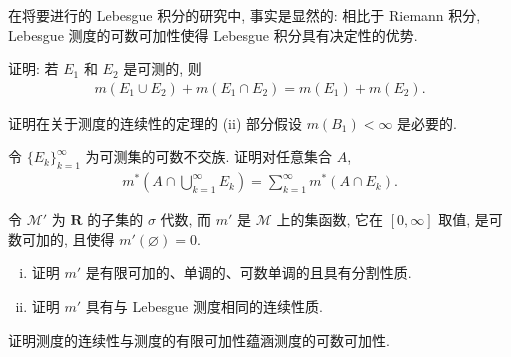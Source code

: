 \documentclass[../../main.tex]{subfiles}
\begin{document}
\begin{remark}
在将要进行的 Lebesgue 积分的研究中, 事实是显然的: 相比于 Riemann 积分, Lebesgue 测度的可数可加性使得 Lebesgue 积分具有决定性的优势.
\end{remark}

\begin{exercise}\label{exercise:ch02-24}
证明: 若 $E_{1}$ 和 $E_{2}$ 是可测的, 则
\begin{align*}
m(E_{1}\cup E_{2})+m(E_{1}\cap E_{2})=m(E_{1})+m(E_{2}).
\end{align*}
\end{exercise}

\begin{exercise}\label{exercise:ch02-25}
证明在关于测度的连续性的定理的 (ii) 部分假设 $m(B_{1})<\infty$ 是必要的.
\end{exercise}

\begin{exercise}\label{exercise:ch02-26}
令 $\{E_{k}\}_{k=1}^{\infty}$ 为可测集的可数不交族. 证明对任意集合 $A$,
\begin{align*}
m^{*}\left(A\cap\bigcup_{k=1}^{\infty}E_{k}\right)=\sum_{k=1}^{\infty}m^{*}(A\cap E_{k}).
\end{align*}
\end{exercise}

\begin{exercise}\label{exercise:ch02-27}
令 $\mathcal{M}'$ 为 $\mathbf{R}$ 的子集的 $\sigma$ 代数, 而 $m'$ 是 $\mathcal{M}$ 上的集函数, 它在 $[0,\infty]$ 取值, 是可数可加的, 且使得 $m'(\varnothing)=0$.
\begin{enumerate}[(i)]
\item 证明 $m'$ 是有限可加的、单调的、可数单调的且具有分割性质.
\item 证明 $m'$ 具有与 Lebesgue 测度相同的连续性质.
\end{enumerate}
\end{exercise}

\begin{exercise}\label{exercise:ch02-28}
证明测度的连续性与测度的有限可加性蕴涵测度的可数可加性.
\end{exercise}
\end{document}
